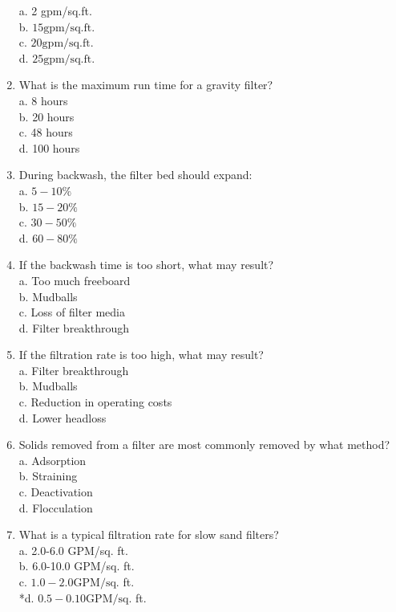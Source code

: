 \begin{enumerate}
a. 2 gpm/sq.ft.\\
b. $15 \mathrm{gpm} / \mathrm{sq} . \mathrm{ft}$.\\
c. $20 \mathrm{gpm} / \mathrm{sq} . \mathrm{ft}$.\\
d. $25 \mathrm{gpm} / \mathrm{sq} . \mathrm{ft}$.\\
\item What is the maximum run time for a gravity filter?\\
a. 8 hours\\
b. 20 hours\\
c. 48 hours\\
d. 100 hours\\
\item During backwash, the filter bed should expand:\\
a. $5-10 \%$\\
b. $15-20 \%$\\
c. $30-50 \%$\\
d. $60-80 \%$\\
\item If the backwash time is too short, what may result?\\
a. Too much freeboard\\
b. Mudballs\\
c. Loss of filter media\\
d. Filter breakthrough\\
\item If the filtration rate is too high, what may result?\\
a. Filter breakthrough\\
b. Mudballs\\
c. Reduction in operating costs\\
d. Lower headloss\\
\item Solids removed from a filter are most commonly removed by what method?\\
a. Adsorption\\
b. Straining\\
c. Deactivation\\
d. Flocculation\\
\item What is a typical filtration rate for slow sand filters?\\
a. 2.0-6.0 GPM/sq. ft.\\
b. 6.0-10.0 GPM/sq. ft.\\
c. $1.0-2.0 \mathrm{GPM} / \mathrm{sq}$. ft.\\
*d. $0.5-0.10 \mathrm{GPM} / \mathrm{sq}$. ft.\\

\end{enumerate}
